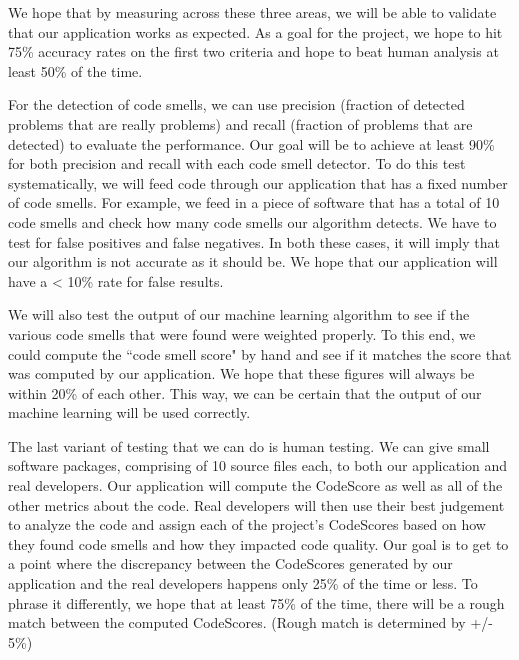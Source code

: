 \documentclass{sig-alternate}
\begin{document}
We hope that by measuring across these three areas, we will be able to validate that our application works as expected. As a goal for the project, we hope to hit 75\% accuracy rates on the first two criteria and hope to beat human analysis at least 50\% of the time.

For the detection of code smells, we can use precision (fraction of detected problems that are really problems) and recall (fraction of problems that are detected) to evaluate the performance. Our goal will be to achieve at least 90\% for both precision and recall with each code smell detector. To do this test systematically, we will feed code through our application that has a fixed number of code smells. For example, we feed in a piece of software that has a total of 10 code smells and check how many code smells our algorithm detects. We have to test for false positives and false negatives. In both these cases, it will imply that our algorithm is not accurate as it should be. We hope that our application will have a < 10\% rate for false results. 

We will also test the output of our machine learning algorithm to see if the various code smells that were found were weighted properly. To this end, we could compute the ``code smell score" by hand and see if it matches the score that was computed by our application. We hope that these figures will always be within 20\% of each other. This way, we can be certain that the output of our machine learning will be used correctly.

The last variant of testing that we can do is human testing. We can give small software packages, comprising of 10 source files each, to both our application and real developers. Our application will compute the CodeScore as well as all of the other metrics about the code. Real developers will then use their best judgement to analyze the code and assign each of the project's CodeScores based on how they found code smells and how they impacted code quality. Our goal is to get to a point where the discrepancy between the CodeScores generated by our application and the real developers happens only 25\% of the time or less. To phrase it differently, we hope that at least 75\% of the time, there will be a rough match between the computed CodeScores. (Rough match is determined by +/- 5\%)
\end{document}
